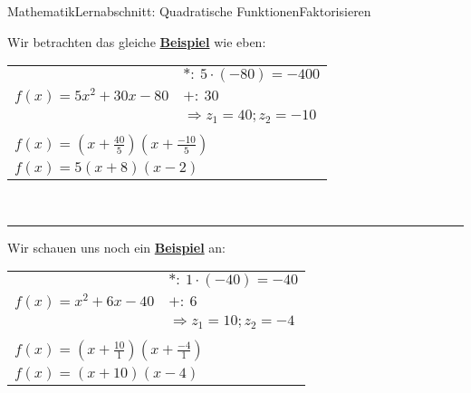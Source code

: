 \documentclass[11pt,twocolumn,oneside,openany,headings=optiontotoc,11pt,numbers=noenddot]{article}
\begin{document}
\begin{worksheet}{Mathematik}{Lernabschnitt: Quadratische Funktionen}{Faktorisieren}
\begin{itemize}
		\end{itemize}
		Wir betrachten das gleiche \underline{\textbf{Beispiel}} wie eben:\\
		\par\noindent
		\begin{tabularx}{0.5\textwidth}{X|l}
			\cline{2-2}
			& \(*:\ 5\cdot(-80)=-400\)\\
			\(f(x) = 5x^2 + 30x -80\) & \(+:\ 30\)\\
			& \(\Rightarrow z_1 = 40; z_2 = -10\)\\
			\cline{2-2}
			\multicolumn{2}{l}{}\\
			\multicolumn{2}{l}{\(f(x) = (x+\frac{40}{5})(x+\frac{-10}{5})\)}\\
			\multicolumn{2}{l}{\(f(x) = 5(x+8)(x-2)\)}
		\end{tabularx}\\
		\par\noindent
		\rule{0.45\textwidth}{0.1pt}
		Wir schauen uns noch ein \underline{\textbf{Beispiel}} an:\\
		\par\noindent
		\begin{tabularx}{0.5\textwidth}{X|l}
			\cline{2-2}
			& \(*:\ 1\cdot(-40)=-40\)\\
			\(f(x) = x^2 + 6x - 40\) & \(+:\ 6\)\\
			& \(\Rightarrow z_1 = 10; z_2 = -4\)\\
			\cline{2-2}
			\multicolumn{2}{l}{}\\
			\multicolumn{2}{l}{\(f(x) = (x+\frac{10}{1})(x+\frac{-4}{1})\)}\\
			\multicolumn{2}{l}{\(f(x) = (x+10)(x-4)\)}\\
		\end{tabularx}

\end{worksheet}
\end{document}
